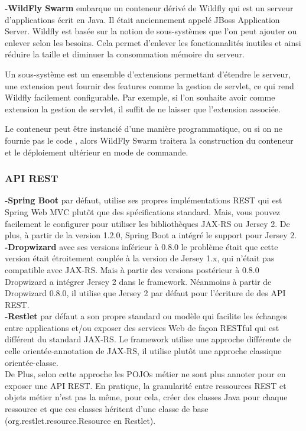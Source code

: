 \documentclass[12pt, a4paper, openany]{report}
\begin{document}
   
   \textbf{-WildFly Swarm}  embarque un conteneur dérivé de Wildfly qui est un serveur d’applications écrit en Java. Il était anciennement appelé JBoss Application Server. Wildfly est basée sur la notion de sous-systèmes que l’on peut ajouter ou enlever selon les besoins. Cela permet d’enlever les fonctionnalités inutiles et ainsi réduire la taille et diminuer la consommation mémoire du serveur.
   
   Un sous-système est un ensemble d’extensions permettant d’étendre le serveur, une extension peut fournir des features comme la gestion de servlet, ce qui rend Wildfly facilement configurable. Par exemple, si l’on souhaite avoir comme extension la gestion de servlet, il suffit de ne laisser que l’extension associée.
   
   Le conteneur peut être instancié d'une manière programmatique, ou si on ne fournie pas le code , alors WildFly Swarm traitera la construction du conteneur et le déploiement ultérieur en mode de commande.\\
   
   \subsubsection{API REST}
   
   \textbf{-Spring Boot} par défaut, utilise ses propres implémentations REST qui est Spring Web MVC plutôt que des spécifications standard. Mais, vous pouvez facilement le configurer pour utiliser les bibliothèques JAX-RS ou Jersey 2. De plus, à partir de la version 1.2.0, Spring Boot a intégré le support pour Jersey 2. \\
   
   \textbf{-Dropwizard} avec ses versions inférieur à 0.8.0 le problème était que cette version était étroitement couplée à la version de Jersey 1.x, qui n'était pas compatible avec JAX-RS. Mais à partir des versions postérieur à 0.8.0 Dropwizard a intégrer Jersey 2 dans le framework. Néanmoins à partir de Dropwizard 0.8.0, il utilise que Jersey 2 par défaut pour l'écriture de des API REST. \\
   
   \textbf{-Restlet} par défaut a son propre standard ou modèle qui facilite les échanges entre applications et/ou exposer des services Web de façon RESTful qui est différent du standard JAX-RS. Le framework utilise une approche différente de celle orientée-annotation de JAX-RS, il utilise plutôt une approche classique orientée-classe.\\
   De Plus, selon cette approche les POJOs métier ne sont plus annoter pour en exposer une API REST. En pratique, la granularité entre ressources REST et objets métier n'est pas la même, pour cela, créer des classes Java pour chaque ressource et que ces classes héritent d'une classe de base (org.restlet.resource.Resource en Restlet).
   
\end{document}
